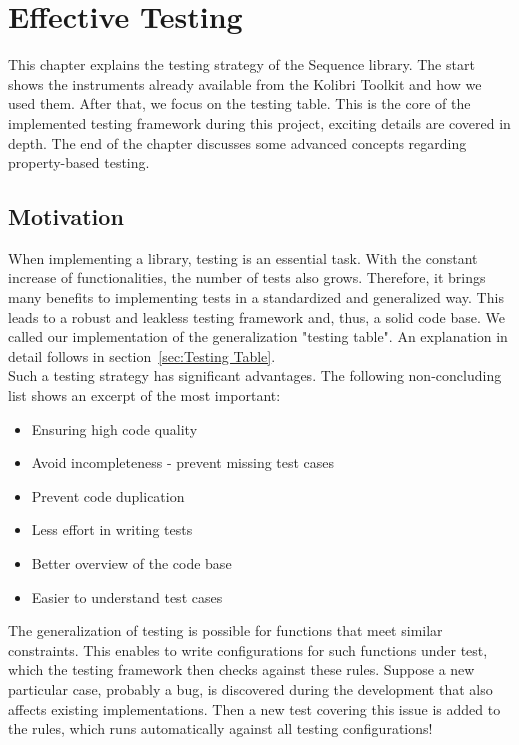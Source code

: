 \chapter{Effective Testing}
\label{chap:Effective_Testing}
This chapter explains the testing strategy of the Sequence library. The start
shows the instruments already available from the Kolibri Toolkit and
how we used them. After that, we focus on the testing table. 
This is the core of the implemented testing framework during this project,
exciting details are covered in depth. The end of the chapter discusses some
advanced concepts regarding property-based testing.

\section{Motivation}
\label{sec:Motivation}
When implementing a library, testing is an essential task. With the constant
increase of functionalities, the number of tests also grows. Therefore, it
brings many benefits to implementing tests in a standardized and generalized
way. This leads to a robust and leakless testing framework and, thus, a solid
code base. We called our implementation of the generalization "testing table".
An explanation in detail follows in section~\ref{sec:Testing Table}. \\
Such a testing strategy has significant advantages. The following
non-concluding list shows an excerpt of the most important:

\begin{itemize}
  \item{Ensuring high code quality}
  \item{Avoid incompleteness - prevent missing test cases}
  \item{Prevent code duplication}
  \item{Less effort in writing tests}
  \item{Better overview of the code base}
  \item{Easier to understand test cases}
\end{itemize}

The generalization of testing is possible for functions that meet similar
constraints. This enables to write configurations for such functions under
test, which the testing framework then checks against these rules. Suppose a
new particular case, probably a bug, is discovered during the development that
also affects existing implementations. Then a new test covering this issue is
added to the rules, which runs automatically against all testing
configurations!

